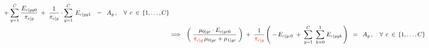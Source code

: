 \begin{eqnarray*}
		\; + \;
		\overset{C}{\underset{y=1}{\sum}}\;
		\dfrac{E_{c \vert gy0}}{\pi_{c \vert g}}
		\; + \;
		\dfrac{1}{\pi_{c \vert g}}
		\cdot
			\overset{C}{\underset{y=1}{\sum}}\;
			\,E_{c \vert gy1}\,
		\;\; = \;\;
		A_{g}\,,
		\quad\forall\;\,c\;\in\,\{1,\ldots,C\}
\\
&\Longrightarrow&
		\left(\;
			\dfrac{\mu_{0 \vert gc} \cdot E_{c \vert gc0}}{
				{\color{red}\pi_{c \vert g}}\,\mu_{0 \vert gc} + \mu_{1\vert gc}
				}
		\;\right)
		\; + \;
		\dfrac{1}{\color{red}\pi_{c \vert g}}
		\left(\;
			-\,E_{c \vert gc0}
			\; + \;
			\overset{C}{\underset{y=1}{\sum}}\;\;
			\overset{1}{\underset{k=0}{\sum}}\;
			E_{c \vert gyk}
		\,\right)
		\;\; = \;\;
		A_{g}\,,
		\quad\forall\;\,c\;\in\,\{1,\ldots,C\}
\end{eqnarray*}

